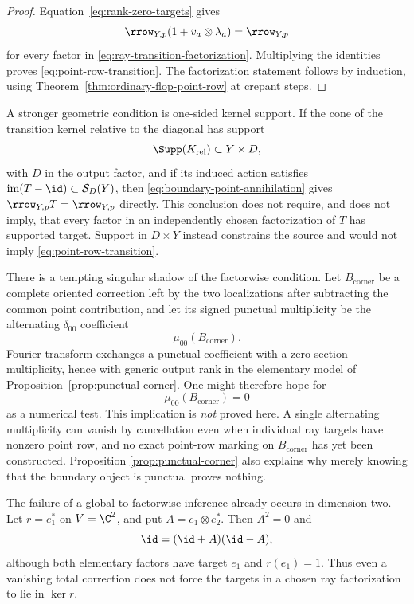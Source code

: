 \begin{proof}
Equation~\eqref{eq:rank-zero-targets} gives
\[
 \rrow_{Y,p}(1+v_a\otimes\lambda_a)=\rrow_{Y,p}
\]
for every factor in \eqref{eq:ray-transition-factorization}.  Multiplying the
identities proves \eqref{eq:point-row-transition}.  The
factorization statement follows by induction, using
Theorem~\ref{thm:ordinary-flop-point-row} at crepant steps.
\end{proof}

A stronger geometric condition is one-sided kernel support.  If the cone of
the transition kernel relative to the diagonal has support
\begin{equation}\label{eq:output-kernel-support}
 \Supp(K_{\mathrm{rel}})\subset Y\times D,
\end{equation}
with \(D\) in the output factor, and if its induced action satisfies
\(\operatorname{im}(T-\id)\subset\mathcal S_D(Y)\), then
\eqref{eq:boundary-point-annihilation} gives
\(\rrow_{Y,p}T=\rrow_{Y,p}\) directly.  This conclusion does not require, and
does not imply, that every factor in an independently chosen factorization
of \(T\) has supported target.  Support in \(D\times Y\) instead constrains
the source and would not imply \eqref{eq:point-row-transition}.

There is a tempting singular shadow of the factorwise condition.  Let
\(B_{\mathrm{corner}}\) be a complete oriented correction left by the two
localizations after subtracting the common point contribution, and let its
signed punctual multiplicity be the alternating \(\delta_{00}\) coefficient
\[
 \mu_{00}(B_{\mathrm{corner}}).
\]
Fourier transform exchanges a punctual coefficient with a zero-section
multiplicity, hence with generic output rank in the elementary model of
Proposition~\ref{prop:punctual-corner}.  One might therefore hope for
\begin{equation}\label{eq:punctual-shadow-vanishing}
 \mu_{00}(B_{\mathrm{corner}})=0
\end{equation}
as a numerical test.  This implication is \emph{not} proved here.  A single
alternating multiplicity can vanish by cancellation even when individual
ray targets have nonzero point row, and no exact point-row marking on
\(B_{\mathrm{corner}}\) has yet been constructed.  Proposition
\ref{prop:punctual-corner} also explains why merely knowing that the boundary
object is punctual proves nothing.

The failure of a global-to-factorwise inference already occurs in dimension
two.  Let \(r=e_1^*\) on \(V=\C^2\), and put
\(A=e_1\otimes e_2^*\).  Then \(A^2=0\) and
\begin{equation}\label{eq:factor-cancellation}
 \id=(\id+A)(\id-A),
\end{equation}
although both elementary factors have target \(e_1\) and
\(r(e_1)=1\).  Thus even a vanishing total correction does not force the
targets in a chosen ray factorization to lie in \(\ker r\).

